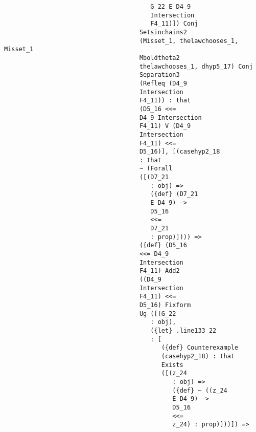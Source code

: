 \documentclass[12pt]{article}
\begin{document}
\begin{verbatim}
                                        G_22 E D4_9 
                                        Intersection 
                                        F4_11)]) Conj 
                                     Setsinchains2 
                                     (Misset_1, thelawchooses_1, Misset_1 
                                     Mboldtheta2 
                                     thelawchooses_1, dhyp5_17) Conj 
                                     Separation3 
                                     (Refleq (D4_9 
                                     Intersection 
                                     F4_11)) : that 
                                     (D5_16 <<= 
                                     D4_9 Intersection 
                                     F4_11) V (D4_9 
                                     Intersection 
                                     F4_11) <<= 
                                     D5_16)], [(casehyp2_18 
                                     : that 
                                     ~ (Forall 
                                     ([(D7_21 
                                        : obj) => 
                                        ({def} (D7_21 
                                        E D4_9) -> 
                                        D5_16 
                                        <<= 
                                        D7_21 
                                        : prop)]))) => 
                                     ({def} (D5_16 
                                     <<= D4_9 
                                     Intersection 
                                     F4_11) Add2 
                                     ((D4_9 
                                     Intersection 
                                     F4_11) <<= 
                                     D5_16) Fixform 
                                     Ug ([(G_22 
                                        : obj), 
                                        ({let} .line133_22 
                                        : [
                                           ({def} Counterexample 
                                           (casehyp2_18) : that 
                                           Exists 
                                           ([(z_24 
                                              : obj) => 
                                              ({def} ~ ((z_24 
                                              E D4_9) -> 
                                              D5_16 
                                              <<= 
                                              z_24) : prop)]))]) => 

\end{verbatim}
\end{document}
